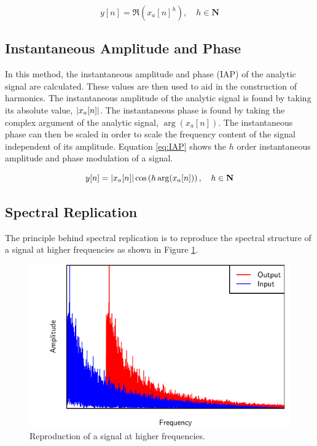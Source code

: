 		\begin{equation}
			y[n] = \Re \left( x_{a}[n]^{h} \right), \quad h \in \mathbf{N}
			\label{eq:SSB}
		\end{equation}

	\subsection{Instantaneous Amplitude and Phase}
	\label{sec:Excitation-Methods-IAP}
		In this method, the instantaneous amplitude and phase (IAP) of the analytic signal are calculated. These
		values are then used to aid in the construction of harmonics. The instantaneous amplitude of the analytic
		signal is found by taking its absolute value, $\left|x_{a}[n]\right|$. The instantaneous phase is found by taking
		the complex argument of the analytic signal, $\arg(x_{a}[n])$. The instantaneous phase can then be scaled
		in order to scale the frequency content of the signal independent of its amplitude. Equation \ref{eq:IAP}
		shows the $h$ order instantaneous amplitude and phase modulation of a signal.

		\begin{equation}
			y[n] = \left|x_{a}[n]\right| \cos \left( h\arg(x_{a}[n]) \right), \quad h \in \mathbf{N}
			\label{eq:IAP}
		\end{equation}

	\subsection{Spectral Replication}
	\label{sec:Excitation-Methods-SpectralReplication}
		The principle behind spectral replication is to reproduce the spectral structure of a signal at higher
		frequencies as shown in Figure \ref{fig:SpectralReplication}.

		\begin{figure}[h!]
			\centering
			\includegraphics{chapter3/Images/SpectralReplicationSpectrum.pdf}
			\caption{Reproduction of a signal at higher frequencies.}
			\label{fig:SpectralReplication}
		\end{figure}

